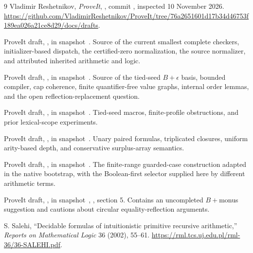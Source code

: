 \begin{thebibliography}{9}
Vladimir Reshetnikov, \emph{ProveIt}, , commit
, inspected 10 November 2026.
\url{https://github.com/VladimirReshetnikov/ProveIt/tree/76a2651601d17b34d46753f189ea026a21ce8d29/docs/drafts}.

ProveIt draft, , in
snapshot~\cite{snapshot}. Source of the current smallest complete
checkers, initializer-based dispatch, the certified-zero normalization,
the source normalizer, and attributed inherited arithmetic and logic.

ProveIt draft, , in
snapshot~\cite{snapshot}. Source of the tied-seed $B+\epsilon$ basis,
bounded compiler, cap coherence, finite quantifier-free value graphs,
internal order lemmas, and the open reflection-replacement question.

ProveIt draft, , in
snapshot~\cite{snapshot}. Tied-seed macros, finite-profile obstructions,
and prior lexical-scope experiments.

ProveIt draft, , in
snapshot~\cite{snapshot}. Unary paired formulas, triplicated closures,
uniform arity-based depth, and conservative surplus-array semantics.

ProveIt draft, , in
snapshot~\cite{snapshot}. The finite-range guarded-case construction
adapted in the native bootstrap, with the Boolean-first selector supplied
here by different arithmetic terms.

ProveIt draft, , in
snapshot~\cite{snapshot}, , section 5.
Contains an uncompleted $B+$monus suggestion and cautions about circular
equality-reflection arguments.

S. Salehi, ``Decidable formulas of intuitionistic primitive recursive
arithmetic,'' \emph{Reports on Mathematical Logic} 36 (2002), 55--61.
\url{https://rml.tcs.uj.edu.pl/rml-36/36-SALEHI.pdf}.
\end{thebibliography}
